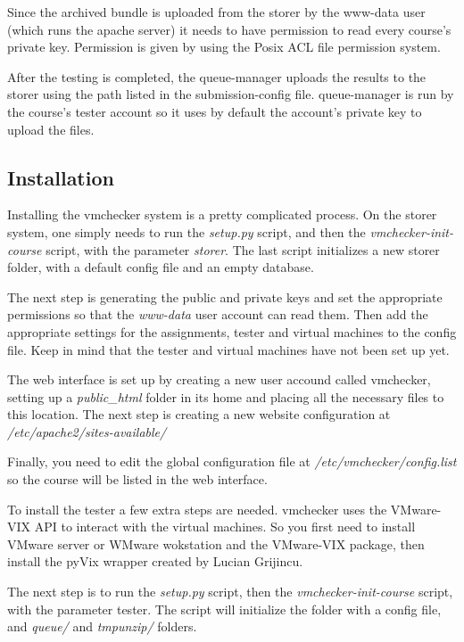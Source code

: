 Since the archived bundle is uploaded from the storer by the www-data user (which
runs the apache server) it needs to have permission to read every course's private key. 
Permission is given by using the Posix ACL file permission system.

After the testing is completed, the queue-manager uploads the results to the storer
using the path listed in the submission-config file. queue-manager is run by the 
course's tester account so it uses by default the account's private key to upload
the files.

\subsection{Installation}
\label{sub-sec:install}

Installing the vmchecker system is a pretty complicated process.
On the storer system, one simply needs to run the \textit{setup.py} script, and then 
the \textit{vmchecker-init-course} script, with the parameter \textit{storer}. The last script
initializes a new storer folder, with a default config file and an empty database.

The next step is generating the public and private keys and set the appropriate 
permissions so that the \textit{www-data} user account can read them. Then add the appropriate 
settings for the assignments, tester and virtual machines to the config file.
Keep in mind that the tester and virtual machines have not been set up yet.

The web interface is set up by creating a new user accound called vmchecker,
setting up a \textit{public_html} folder in its home and placing all the necessary files
to this location. The next step is creating a new website configuration at 
\textit{/etc/apache2/sites-available/}

Finally, you need to edit the global configuration file at \textit{/etc/vmchecker/config.list}
so the course will be listed in the web interface.

To install the tester a few extra steps are needed. vmchecker uses the VMware-VIX
API to interact with the virtual machines. So you first need to install VMware
server or WMware wokstation and the VMware-VIX package, then install the pyVix 
wrapper created by Lucian Grijincu.

The next step is to run the \textit{setup.py} script, then the \textit{vmchecker-init-course} script,
with the parameter tester. The script will initialize the folder with a config file,
and \textit{queue/} and \textit{tmpunzip/} folders.

